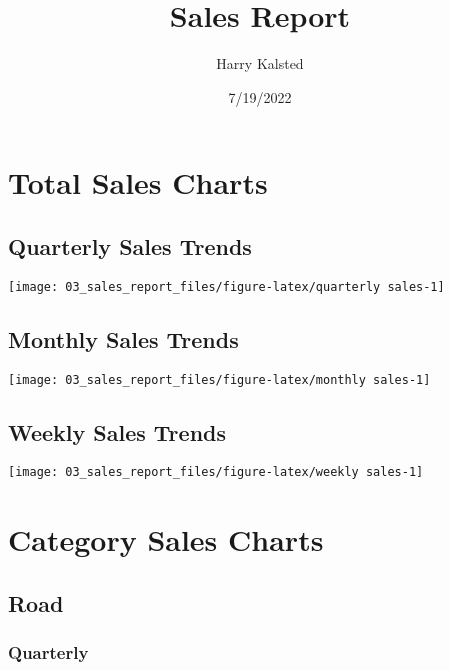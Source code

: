 \documentclass[
]{article}
\title{Sales Report}
\author{Harry Kalsted}
\date{7/19/2022}
\begin{document}
\maketitle

\hypertarget{total-sales-charts}{%
\section{Total Sales Charts}\label{total-sales-charts}}

\hypertarget{quarterly-sales-trends}{%
\subsection{Quarterly Sales Trends}\label{quarterly-sales-trends}}

\texttt{[image: 03\_sales\_report\_files/figure-latex/quarterly sales-1]}

\hypertarget{monthly-sales-trends}{%
\subsection{Monthly Sales Trends}\label{monthly-sales-trends}}

\texttt{[image: 03\_sales\_report\_files/figure-latex/monthly sales-1]}

\hypertarget{weekly-sales-trends}{%
\subsection{Weekly Sales Trends}\label{weekly-sales-trends}}

\texttt{[image: 03\_sales\_report\_files/figure-latex/weekly sales-1]}

\hypertarget{category-sales-charts}{%
\section{Category Sales Charts}\label{category-sales-charts}}

\hypertarget{road}{%
\subsection{Road}\label{road}}

\hypertarget{quarterly}{%
\subsubsection{Quarterly}\label{quarterly}}
\end{document}
